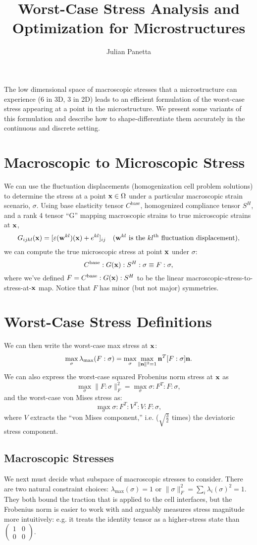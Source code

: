 \documentclass[10pt]{article}
\title{Worst-Case Stress Analysis and Optimization for Microstructures}
\author{Julian Panetta}
\providecommand{\norm}[1]{\lVert#1\rVert}
\renewcommand{\vec}[1]{{\bf #1}}
\def\n{{\bf n}}
\def\x{\vec{x}}
\def\w{\vec{w}}
\def\strain{\varepsilon}
\begin{document}
\maketitle

The low dimensional space of macroscopic stresses that a microstructure can
experience (6 in 3D, 3 in 2D) leads to an efficient formulation of the
worst-case stress appearing at a point in the microstructure. We present some
variants of this formulation and describe how to shape-differentiate them
accurately in the continuous and discrete setting.

\section{Macroscopic to Microscopic Stress}
We can use the fluctuation displacements (homogenization cell problem solutions)
to determine the stress at a point $\x \in \Omega$ under a particular macroscopic strain
scenario, $\sigma$. Using base elasticity tensor $C^\text{base}$, homogenized
compliance tensor $S^H$, and a rank 4 tensor ``G'' mapping macroscopic strains to true microscopic strains at $\x$,
$$
G_{ijkl}(\x) = [\strain(\w^{kl})(\x) + e^{kl}]_{ij} \quad (\w^{kl} \text{ is the } kl^\text{th} \text{ fluctuation displacement}),
$$
we can compute the true microscopic stress at point $\x$ under $\sigma$:
\begin{equation}
\label{eqn:macro_micro}
C^\text{base} : G(\x) : S^H : \sigma \equiv F : \sigma,
\end{equation}
where we've defined $F = C^\text{base} : G(\x) : S^H$ to be the linear
macroscopic-stress-to-stress-at-$\x$ map. Notice that $F$ has minor (but not major) symmetries.

\section{Worst-Case Stress Definitions}
We can then write the worst-case max stress at $\x$:
$$
\max_\sigma \lambda_\text{max}(F : \sigma) = \max_\sigma \max_{\norm{\n}^2 = 1} \n^T [F : \sigma] \n.
$$
We can also express the worst-case squared Frobenius norm stress at $\x$ as
$$
\max_\sigma \norm{F : \sigma}_F^2 =
\max_\sigma \sigma : F^T : F : \sigma,
$$
and the worst-case von Mises stress as:
$$
\max_\sigma \sigma : F^T : V^T : V : F : \sigma,
$$
where $V$ extracts the ``von Mises component,'' i.e. ($\sqrt{\frac{3}{2}}$
times) the deviatoric stress component.

\subsection{Macroscopic Stresses}
We next must decide what subspace of macroscopic stresses to consider. There
are two natural constraint choices: $\lambda_\text{max}(\sigma) = 1$ or
$\norm{\sigma}_F^2 = \sum_i \lambda_i(\sigma)^2 = 1$. They both bound
the traction that is applied to the cell interfaces, but the Frobenius
norm is easier to work with and arguably measures stress magnitude more intuitively:
e.g. it treats the identity tensor as a higher-stress state than
$\begin{pmatrix}1 & 0 \\ 0 & 0\end{pmatrix}$.
\end{document}
